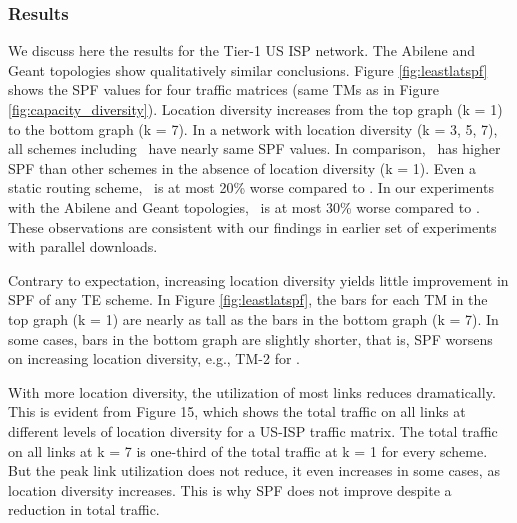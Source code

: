 \subsubsection{Results}


We discuss here the results for the Tier-1 US ISP network. 
The Abilene and Geant topologies show qualitatively similar conclusions.
Figure \ref{fig:leastlatspf} shows the SPF values for four traffic matrices (same TMs as in Figure \ref{fig:capacity_diversity}). 
Location diversity increases from the top  graph (k = 1)  to the bottom graph (k = 7).
In a network with location diversity  (k = 3, 5, 7), all schemes including \opt\ have nearly same SPF values.
In comparison, \opt\ has higher SPF than other schemes in the absence of location diversity (k = 1). 
Even a static routing scheme, \invcap\ is at most 20\% worse compared to \opt.
In our experiments with the Abilene and Geant topologies, \invcap\ is at most 30\% worse compared to \opt. 
These observations are consistent with our findings in earlier set of experiments with parallel downloads.




Contrary to expectation, increasing location diversity yields little improvement in SPF of any TE scheme.
In Figure \ref{fig:leastlatspf}, the bars for each TM in the top graph (k = 1) are nearly as  tall as the bars in the bottom graph (k = 7). 
In some cases, bars in the bottom graph are slightly shorter, that is, SPF worsens on increasing location diversity, e.g.,  TM-2 for \opt.


With more location diversity, the utilization  of most links reduces dramatically.
This is evident from Figure 15, which shows the total traffic on all links at different levels of location diversity for a US-ISP  traffic matrix.
The total traffic on all links at k = 7 is one-third of the total traffic at k = 1 for every scheme.
But the peak link utilization does not reduce, it even increases in some cases, as location diversity increases.
This is why SPF does not improve despite a reduction in total traffic. 

